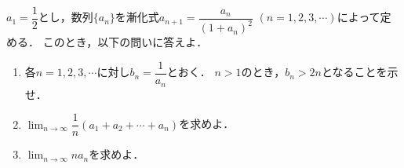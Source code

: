 \documentclass[../../main.tex]{subfiles}
\begin{document}
$\displaystyle a_1=\dfrac{1}{2}$とし，数列$\{ a_n \}$を漸化式$\displaystyle a_{n+1}=\dfrac{a_n}{(1+a_n)^2}$ $(n=1,2,3,\cdots)$によって定める．
このとき，以下の問いに答えよ．
\begin{enumerate}
  \item 各$n=1,2,3,\cdots$に対し$\displaystyle b_n=\dfrac{1}{a_n}$とおく．
    $n>1$のとき，$b_n>2n$となることを示せ．
  \item $\displaystyle\lim_{n\to\infty}\dfrac{1}{n}(a_1+a_2+\cdots+a_n)$を求めよ．
  \item $\displaystyle\lim_{n\to\infty}na_n$を求めよ．
\end{enumerate}
\end{document}
